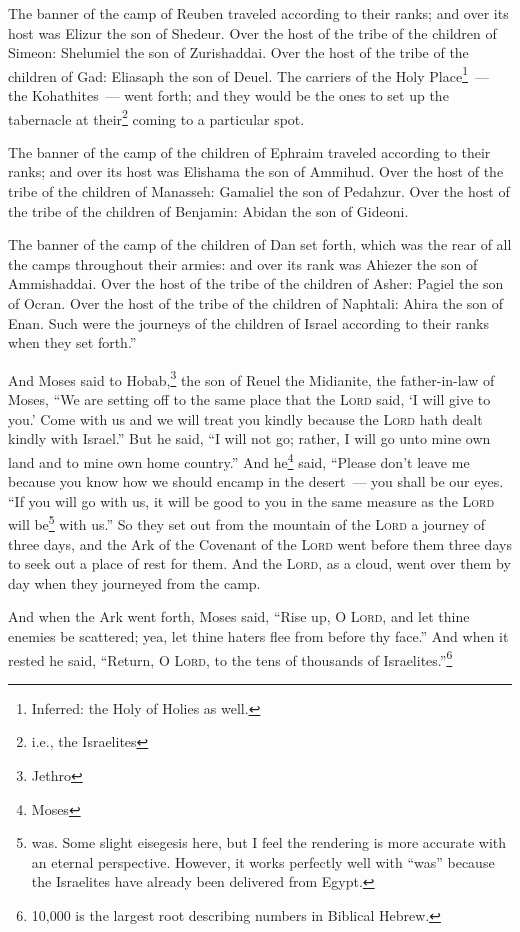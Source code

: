 \begin{inparaenum}
     The banner of the camp of Reuben traveled according to their ranks; and over its host was Elizur the son of Shedeur.%
     Over the host of the tribe of the children of Simeon: Shelumiel the son of Zurishaddai.%
     Over the host of the tribe of the children of Gad: Eliasaph the son of Deuel.%
     The carriers of the Holy Place\footnote{Inferred: the Holy of Holies as well.}~--- the Kohathites~--- went forth; and they would be the ones to set up the tabernacle at their\footnote{i.e., the Israelites} coming to a particular spot.%
    
     The banner of the camp of the children of Ephraim traveled according to their ranks; and over its host was Elishama the son of Ammihud.%
     Over the host of the tribe of the children of Manasseh: Gamaliel the son of Pedahzur.%
     Over the host of the tribe of the children of Benjamin: Abidan the son of Gideoni.%
    
     The banner of the camp of the children of Dan set forth, which was the rear of all the camps throughout their armies: and over its rank was Ahiezer the son of Ammishaddai.%
     Over the host of the tribe of the children of Asher: Pagiel the son of Ocran.%
     Over the host of the tribe of the children of Naphtali: Ahira the son of Enan.%
     Such were the journeys of the children of Israel according to their ranks when they set forth.''%
    
     And Moses said to Hobab,\footnote{Jethro} the son of Reuel the Midianite, the father-in-law of Moses, ``We are setting off to the same place that the \textsc{Lord} said, `I will give to you.' Come with us and we will treat you kindly because the \textsc{Lord} hath dealt kindly with Israel.''%
     But he said, ``I will not go; rather, I will go unto mine own land and to mine own home country.''%
     And he\footnote{Moses} said, ``Please don't leave me because you know how we should encamp in the desert~--- you shall be our eyes.%
     ``If you will go with us, it will be good to you in the same measure as the \textsc{Lord} will be\footnote{was. Some slight eisegesis here, but I feel the rendering is more accurate with an eternal perspective. However, it works perfectly well with ``was'' because the Israelites have already been delivered from Egypt.} with us.''%
     So they set out from the mountain of the \textsc{Lord} a journey of three days, and the Ark of the Covenant of the \textsc{Lord} went before them three days to seek out a place of rest for them.%
     And the \textsc{Lord}, as a cloud, went over them by day when they journeyed from the camp.%
    
     And when the Ark went forth, Moses said, ``Rise up, O \textsc{Lord}, and let thine enemies be scattered; yea, let thine haters flee from before thy face.''
     And when it rested he said, ``Return, O \textsc{Lord}, to the tens of thousands of Israelites.''\footnote{10,000 is the largest root describing numbers in Biblical Hebrew.}%
\end{inparaenum}
